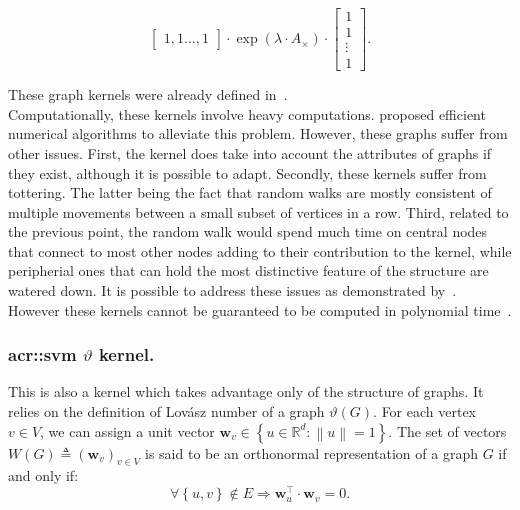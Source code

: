 \begin{itemize}
\begin{equation}
\begin{bmatrix}
                                    1, 1\dots,1
                                \end{bmatrix}\cdot \exp\left(\lambda\cdot A_{\times}\right)\cdot\begin{bmatrix}
                                    1\\
                                    1\\
                                    \vdots\\
                                    1
                                \end{bmatrix}.
                            \end{equation}
                \end{itemize}
                These graph kernels were already defined in~\parencite{gartner2003graph}.\\

            Computationally, these kernels involve heavy computations.
            \textcite{vishwanathan2010graph} proposed efficient numerical algorithms to alleviate this problem.
            However, these graphs suffer from other issues.
            First, the kernel does take into account the attributes of graphs if they exist, although it is possible to adapt.
            Secondly, these kernels suffer from tottering.
            The latter being the fact that random walks are mostly consistent of multiple movements between a small subset of vertices in a row.
            Third, related to the previous point, the random walk would spend much time on central nodes that connect to most other nodes adding to their contribution to the kernel, while peripherial ones that can hold the most distinctive feature of the structure are watered down.
            It is possible to address these issues as demonstrated by~\textcite{horvath2004cyclic, mahe2004extensions}.
            However these kernels cannot be guaranteed to be computed in polynomial time~\parencite{vishwanathan2010graph}.

        \subsubsection{\gls*{acr::svm} $\vartheta$ kernel.}
            This is also a kernel which takes advantage only of the structure of graphs.
            It relies on the definition of Lov\'asz number of a graph $\vartheta(G)$.
            For each vertex $v \in V$, we can assign a unit vector \(\bm{w}_v \in \left\{u \in \mathbb{R}^d: \left\lVert u \right\rVert = 1 \right\}\).
            The set of vectors \(W(G) \triangleq \left(\bm{w}_v\right)_{v \in V}\) is said to be an orthonormal representation of a graph $G$ if and only if:
            \begin{equation*}
                \forall \left\{u,v\right\} \notin E \Rightarrow \bm{w}_u^\intercal\cdot \bm{w}_v=0.
            \end{equation*}


